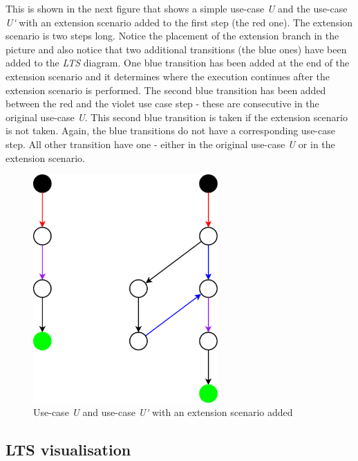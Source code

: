 This is shown in the next figure that shows a simple use-case \emph{U} and the use-case \emph{U\'} with an extension scenario added
to the first step (the red one). The extension scenario is two steps long.
Notice the placement of the extension branch in the picture and also notice that two additional transitions (the blue ones) have been
added to the \emph{LTS} diagram. One blue transition has been added at the end of the extension scenario and it determines where
the execution continues after the extension scenario is performed. The second blue transition has been added between the red and the
violet use case step - these are consecutive in the original use-case \emph{U}. This second blue transition is taken if the extension
scenario is not taken. Again, the blue transitions do not have a corresponding use-case step. All other transition have one - either
in the original use-case \emph{U} or in the extension scenario.

\begin{figure}[ht]
  \centering
  \includegraphics[width=200pt]{images/extension}
  \caption{Use-case \emph{U} and use-case \emph{U\'} with an extension scenario added}
  \label{fig:ExtensionScenario}
\end{figure}

\subsection{LTS visualisation}